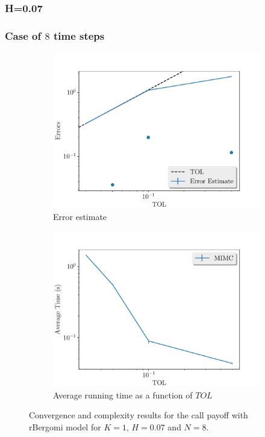 \documentclass[11pt]{article}
\begin{document}
\newpage
\subsubsection*{H=0.07}
\newpage
\subsubsection*{Case of $8$ time steps}
\begin{figure}[!h]
	\centering
	\begin{subfigure}{.4\textwidth}
		\centering
		\includegraphics[width=1\linewidth]{./figures/bergomi_misc/non_hierarchical/H_007/N_8/error_estimate.pdf}
		\caption{Error estimate}
		\label{fig:misc_rbergomi_8_steps_sub1}
	\end{subfigure}%
	\begin{subfigure}{.4\textwidth}
		\centering
		\includegraphics[width=1\linewidth]{./figures/bergomi_misc/non_hierarchical/H_007/N_8/average_running_time.pdf}
		\caption{Average running time as a function of $TOL$}
		\label{fig:misc_rbergomi_8_steps_sub2}
	\end{subfigure}%
	\caption{Convergence and complexity results for the call payoff with rBergomi model for $K=1$, $H=0.07$ and $N=8$.}
	\label{fig:misc_rbergomi_8_steps_1}
\end{figure}
\end{document}
